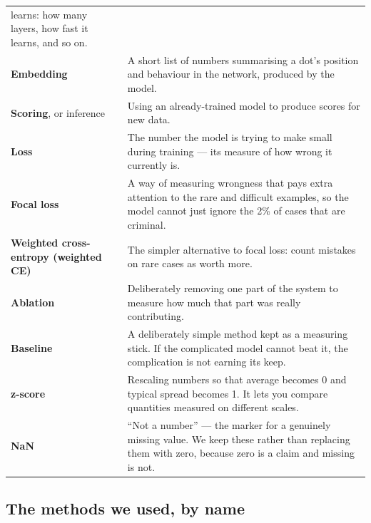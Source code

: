 \documentclass[11pt,a4paper]{article}
\begin{document}
\begin{longtable}{@{}p{4.1cm}p{11.4cm}@{}}
learns: how many layers, how fast it learns, and so on. \\
\textbf{Embedding} & A short list of numbers summarising a dot's position and
behaviour in the network, produced by the model. \\
\textbf{Scoring}, or inference & Using an already-trained model to produce scores
for new data. \\
\textbf{Loss} & The number the model is trying to make small during training ---
its measure of how wrong it currently is. \\
\textbf{Focal loss} & A way of measuring wrongness that pays extra attention to
the rare and difficult examples, so the model cannot just ignore the 2\% of cases
that are criminal. \\
\textbf{Weighted cross-entropy (weighted CE)} & The simpler alternative to focal
loss: count mistakes on rare cases as worth more. \\
\textbf{Ablation} & Deliberately removing one part of the system to measure how
much that part was really contributing. \\
\textbf{Baseline} & A deliberately simple method kept as a measuring stick. If
the complicated model cannot beat it, the complication is not earning its keep. \\
\textbf{z-score} & Rescaling numbers so that average becomes 0 and typical spread
becomes 1. It lets you compare quantities measured on different scales. \\
\textbf{NaN} & ``Not a number'' --- the marker for a genuinely missing value. We
keep these rather than replacing them with zero, because zero is a claim and
missing is not. \\
\bottomrule
\end{longtable}

\subsection{The methods we used, by name}
\end{document}
